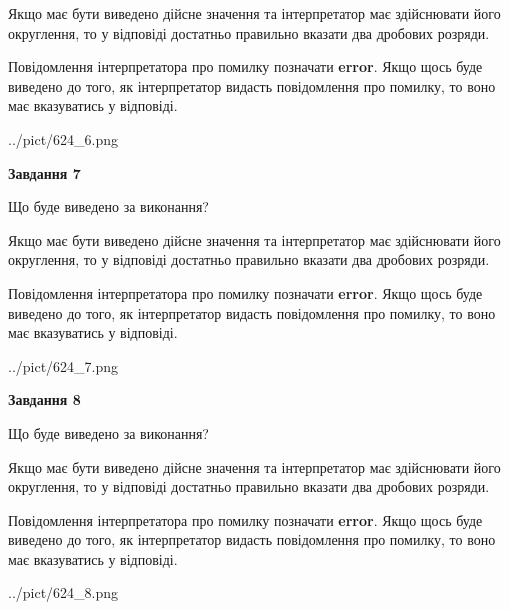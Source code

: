 \documentclass[12pt, ukrainian]{article}
\begin{document}
{\begin {Large}
Якщо має бути виведено дійсне значення та інтерпретатор має здійснювати його округлення, 
то у відповіді достатньо правильно вказати два дробових розряди.

Повідомлення інтерпретатора про помилку позначати \textbf{error}.
Якщо щось буде виведено до того, як інтерпретатор видасть повідомлення про помилку, 
то воно має вказуватись у відповіді. \par

\begin{center}
	{../pict/624_6.png}
\end{center}
\newpage

{\begin {center}\textbf{Завдання 7}\end {center}}\par
Що буде виведено за виконання? \par

Якщо має бути виведено дійсне значення та інтерпретатор має здійснювати його округлення, 
то у відповіді достатньо правильно вказати два дробових розряди.

Повідомлення інтерпретатора про помилку позначати \textbf{error}.
Якщо щось буде виведено до того, як інтерпретатор видасть повідомлення про помилку, 
то воно має вказуватись у відповіді. \par

\begin{center}
	{../pict/624_7.png}
\end{center}
\newpage

{\begin {center}\textbf{Завдання 8}\end {center}}\par
Що буде виведено за виконання? \par

Якщо має бути виведено дійсне значення та інтерпретатор має здійснювати його округлення, 
то у відповіді достатньо правильно вказати два дробових розряди.

Повідомлення інтерпретатора про помилку позначати \textbf{error}.
Якщо щось буде виведено до того, як інтерпретатор видасть повідомлення про помилку, 
то воно має вказуватись у відповіді. \par

\begin{center}
	{../pict/624_8.png}
\end{center}
\newpage


\end{Large}}
\end{document}
